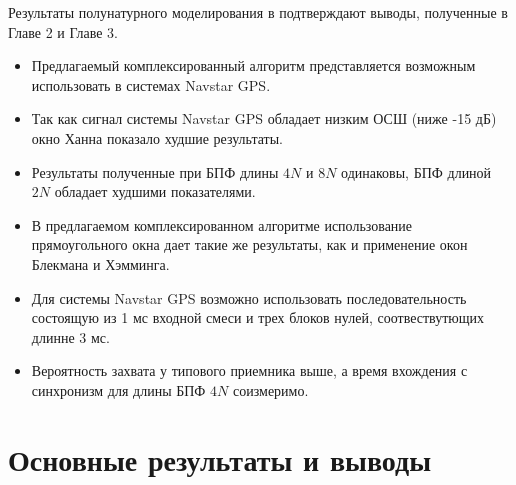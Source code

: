 Результаты полунатурного моделирования в подтверждают выводы, полученные в Главе 2 и Главе 3.

\begin{itemize}
\item Предлагаемый комплексированный алгоритм представляется возможным использовать в системах Navstar GPS.
\item Так как сигнал системы Navstar GPS обладает низким ОСШ (ниже -15 дБ) окно Ханна показало худшие результаты.
\item Результаты полученные при БПФ длины ${4N}$ и ${8N}$ одинаковы, БПФ длиной ${2N}$ обладает худшими показателями.
\item В предлагаемом комплексированном алгоритме использование прямоугольного окна дает такие же результаты, как и применение окон Блекмана и Хэмминга.
\item Для системы Navstar GPS возможно использовать последовательность состоящую из 1 мс входной смеси и трех блоков нулей, соотвествутющих длинне 3 мс.
\item Вероятность захвата у типового приемника выше, а время вхождения с синхронизм для длины БПФ ${4N}$ соизмеримо.
\end{itemize}

\clearpage

\chapter*{Основные результаты и выводы}

